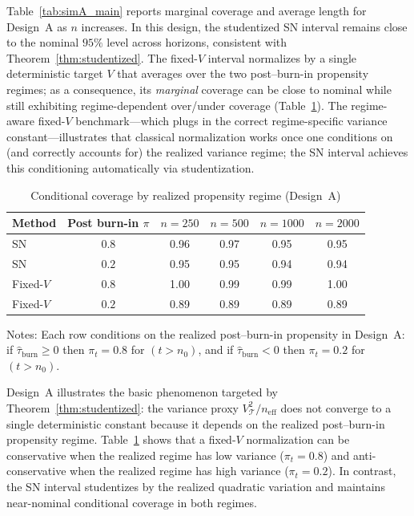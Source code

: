 \documentclass[11pt]{article}
\numberwithin{equation}{section}
\theoremstyle{plain}
\theoremstyle{definition}
\theoremstyle{remark}
\begin{document}
Table~\ref{tab:simA_main} reports marginal coverage and average length for Design~A as $n$ increases. In this design, the studentized SN interval remains close to the nominal $95\%$ level across horizons, consistent with Theorem~\ref{thm:studentized}. The fixed-$V$ interval normalizes by a single deterministic target $V$ that averages over the two post--burn-in propensity regimes; as a consequence, its \emph{marginal} coverage can be close to nominal while still exhibiting regime-dependent over/under coverage (Table~\ref{tab:simA_conditional}). The regime-aware fixed-$V$ benchmark---which plugs in the correct regime-specific variance constant---illustrates that classical normalization works once one conditions on (and correctly accounts for) the realized variance regime; the SN interval achieves this conditioning automatically via studentization.

\begin{table}[t]
\centering
\small
\begin{threeparttable}
\begin{tabular}{lccccc}
\toprule
Method & Post burn-in $\pi$ & $n=250$ & $n=500$ & $n=1000$ & $n=2000$ \\
\midrule
SN & $0.8$ & 0.96 & 0.97 & 0.95 & 0.95 \\
SN & $0.2$ & 0.95 & 0.95 & 0.94 & 0.94 \\
Fixed-$V$ & $0.8$ & 1.00 & 0.99 & 0.99 & 1.00 \\
Fixed-$V$ & $0.2$ & 0.89 & 0.89 & 0.89 & 0.89 \\
\bottomrule
\end{tabular}
\begin{tablenotes}
\small
\item Notes: Each row conditions on the realized post--burn-in propensity in Design~A: if $\widehat\tau_{\mathrm{burn}}\ge 0$ then $\pi_t=0.8$ for $(t>n_0)$, and if $\widehat\tau_{\mathrm{burn}}<0$ then $\pi_t=0.2$ for $(t>n_0)$.
\end{tablenotes}
\end{threeparttable}
\caption{Conditional coverage by realized propensity regime (Design~A)}\label{tab:simA_conditional}
\end{table}

Design~A illustrates the basic phenomenon targeted by Theorem~\ref{thm:studentized}: the variance proxy $V_{\mathcal{T}}^2/n_{\mathrm{eff}}$ does not converge to a single deterministic constant because it depends on the realized post--burn-in propensity regime. Table~\ref{tab:simA_conditional} shows that a fixed-$V$ normalization can be conservative when the realized regime has low variance ($\pi_t=0.8$) and anti-conservative when the realized regime has high variance ($\pi_t=0.2$). In contrast, the SN interval studentizes by the realized quadratic variation and maintains near-nominal conditional coverage in both regimes.
\end{document}
